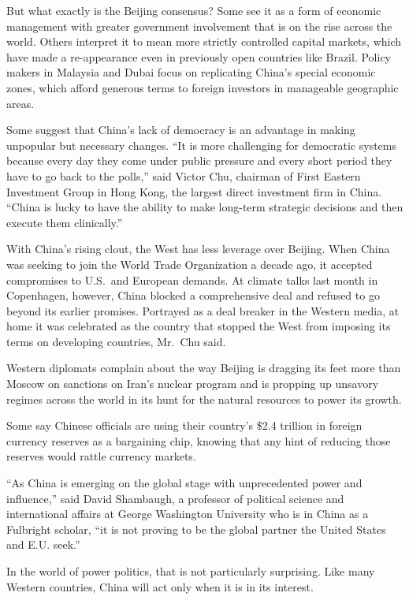 ﻿\documentclass[12pt]{article}
\begin{document}
But what exactly is the Beijing consensus? Some see it as a form of economic management with greater
government involvement that is on the rise across the world. Others interpret it to mean more
strictly controlled capital markets, which have made a re-appearance even in previously open
countries like Brazil. Policy makers in Malaysia and Dubai focus on replicating China's special
economic zones, which afford generous terms to foreign investors in manageable geographic areas.

Some suggest that China's lack of democracy is an advantage in making unpopular but necessary
changes. ``It is more challenging for democratic systems because every day they come under public
pressure and every short period they have to go back to the polls,'' said Victor Chu, chairman of
First Eastern Investment Group in Hong Kong, the largest direct investment firm in China. ``China is
lucky to have the ability to make long-term strategic decisions and then execute them clinically.''

With China's rising clout, the West has less leverage over Beijing. When China was seeking to join
the World Trade Organization a decade ago, it accepted compromises to U.S.~and European demands. At
climate talks last month in Copenhagen, however, China blocked a comprehensive deal and refused to
go beyond its earlier promises. Portrayed as a deal breaker in the Western media, at home it was
celebrated as the country that stopped the West from imposing its terms on developing countries,
Mr.~Chu said.

Western diplomats complain about the way Beijing is dragging its feet more than Moscow on sanctions
on Iran's nuclear program and is propping up unsavory regimes across the world in its hunt for the
natural resources to power its growth.

Some say Chinese officials are using their country's \$2.4 trillion in foreign currency reserves as
a bargaining chip, knowing that any hint of reducing those reserves would rattle currency markets.

``As China is emerging on the global stage with unprecedented power and influence,'' said David
Shambaugh, a professor of political science and international affairs at George Washington
University who is in China as a Fulbright scholar, ``it is not proving to be the global partner the
United States and E.U. seek.''

In the world of power politics, that is not particularly surprising. Like many Western countries,
China will act only when it is in its interest.
\end{document}
